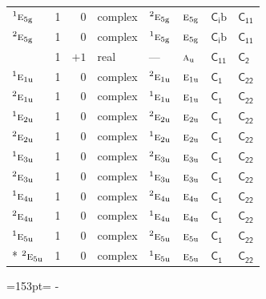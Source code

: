 \documentclass[10pt,a4paper]{article}
\newcommand{\needspace}[1]{\par\penalty-100\begingroup\dimen0=#1\relax\dimen2=\pagegoal
  \advance\dimen2-\pagetotal\ifdim\dimen0>\dimen2\relax\ifdim\dimen2>0pt\vfil\break\fi\fi
  \endgroup}
\numberwithin{equation}{section}
\newcommand{\grp}[1]{\mathsf{#1}}
\newcommand{\irr}[1]{\text{\normalfont\scshape #1}}
\newcommand{\conjpair}[1]{{}^{#1}}
\newcommand{\detbox}[1]{{\setlength{\fboxsep}{1pt}\fbox{#1}}}
\newcommand{\ptag}[1]{\mathrm{#1}}
\newcommand{\secondclass}{\mathrm{b}}
\begin{document}
{\begin{longtable}{@{}lrrlllll@{}}
$\conjpair{1}\irr{e}_{5\ptag{g}}$ & 1 & $0$ & complex & $\conjpair{2}\irr{e}_{5\ptag{g}}$ & $\irr{e}_{5\ptag{g}}$ & \href{S2b.pdf}{$\grp{C_{i}}\secondclass$} & \href{../../../rotation/data/pdf/C11.pdf}{$\grp{C_{11}}$}\\
$\conjpair{2}\irr{e}_{5\ptag{g}}$ & 1 & $0$ & complex & $\conjpair{1}\irr{e}_{5\ptag{g}}$ & $\irr{e}_{5\ptag{g}}$ & \href{S2b.pdf}{$\grp{C_{i}}\secondclass$} & \href{../../../rotation/data/pdf/C11.pdf}{$\grp{C_{11}}$}\\
\detbox{$\irr{a}_{\ptag{u}}$} & 1 & $+1$ & real & --- & $\irr{a}_{\ptag{u}}$ & \href{C11.pdf}{$\grp{C_{11}}$} & \href{../../../rotation/data/pdf/C2.pdf}{$\grp{C_{2}}$}\\
$\conjpair{1}\irr{e}_{1\ptag{u}}$ & 1 & $0$ & complex & $\conjpair{2}\irr{e}_{1\ptag{u}}$ & $\irr{e}_{1\ptag{u}}$ & \href{C1.pdf}{$\grp{C_{1}}$} & $\grp{C_{22}}$\\
$\conjpair{2}\irr{e}_{1\ptag{u}}$ & 1 & $0$ & complex & $\conjpair{1}\irr{e}_{1\ptag{u}}$ & $\irr{e}_{1\ptag{u}}$ & \href{C1.pdf}{$\grp{C_{1}}$} & $\grp{C_{22}}$\\
$\conjpair{1}\irr{e}_{2\ptag{u}}$ & 1 & $0$ & complex & $\conjpair{2}\irr{e}_{2\ptag{u}}$ & $\irr{e}_{2\ptag{u}}$ & \href{C1.pdf}{$\grp{C_{1}}$} & $\grp{C_{22}}$\\
$\conjpair{2}\irr{e}_{2\ptag{u}}$ & 1 & $0$ & complex & $\conjpair{1}\irr{e}_{2\ptag{u}}$ & $\irr{e}_{2\ptag{u}}$ & \href{C1.pdf}{$\grp{C_{1}}$} & $\grp{C_{22}}$\\
$\conjpair{1}\irr{e}_{3\ptag{u}}$ & 1 & $0$ & complex & $\conjpair{2}\irr{e}_{3\ptag{u}}$ & $\irr{e}_{3\ptag{u}}$ & \href{C1.pdf}{$\grp{C_{1}}$} & $\grp{C_{22}}$\\
$\conjpair{2}\irr{e}_{3\ptag{u}}$ & 1 & $0$ & complex & $\conjpair{1}\irr{e}_{3\ptag{u}}$ & $\irr{e}_{3\ptag{u}}$ & \href{C1.pdf}{$\grp{C_{1}}$} & $\grp{C_{22}}$\\
$\conjpair{1}\irr{e}_{4\ptag{u}}$ & 1 & $0$ & complex & $\conjpair{2}\irr{e}_{4\ptag{u}}$ & $\irr{e}_{4\ptag{u}}$ & \href{C1.pdf}{$\grp{C_{1}}$} & $\grp{C_{22}}$\\
$\conjpair{2}\irr{e}_{4\ptag{u}}$ & 1 & $0$ & complex & $\conjpair{1}\irr{e}_{4\ptag{u}}$ & $\irr{e}_{4\ptag{u}}$ & \href{C1.pdf}{$\grp{C_{1}}$} & $\grp{C_{22}}$\\
$\conjpair{1}\irr{e}_{5\ptag{u}}$ & 1 & $0$ & complex & $\conjpair{2}\irr{e}_{5\ptag{u}}$ & $\irr{e}_{5\ptag{u}}$ & \href{C1.pdf}{$\grp{C_{1}}$} & $\grp{C_{22}}$\\*
$\conjpair{2}\irr{e}_{5\ptag{u}}$ & 1 & $0$ & complex & $\conjpair{1}\irr{e}_{5\ptag{u}}$ & $\irr{e}_{5\ptag{u}}$ & \href{C1.pdf}{$\grp{C_{1}}$} & $\grp{C_{22}}$\\
\bottomrule\end{longtable}}
\needspace{153pt}
\end{document}
